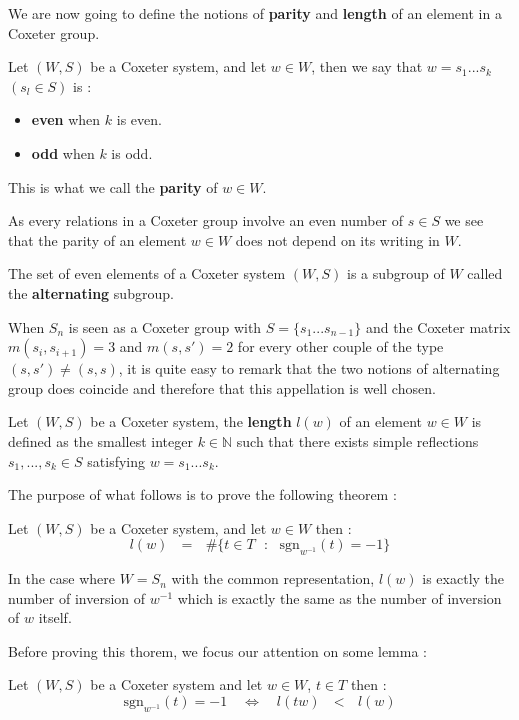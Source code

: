 \documentclass[envcountsame,envcountchap]{svmono}
\newcommand{\N}{\mathbb N}
\newcommand{\tg}[1]{\textbf{#1}}
\newcommand{\q}{\quad}
\newcommand{\qq}{\text{ }}
\begin{document}
	We are now going to define the notions of \tg{parity} and \tg{length} of an element in a Coxeter group.
	\begin{definition}
		Let $(W,S)$ be a Coxeter system, and let $w\in W$, then we say that $w=s_1...s_k$ $(s_l\in S)$ is :
		\begin{itemize}
			\item \tg{even} when $k$ is even.
			\item \tg{odd} when $k$ is odd.
		\end{itemize}
	This is what we call the \tg{parity} of $w\in W$.
	\end{definition}
\begin{remark}
	As every relations in a Coxeter group involve an even number of $s\in S$ we see that the parity of an element $w\in W$ does not depend on its writing in $W$.
\end{remark}
The set of even elements of a Coxeter system $(W,S)$ is a subgroup of $W$ called the \tg{alternating} subgroup.
\begin{remark}
	When $S_n$ is seen as a Coxeter group with $S=\{s_1...s_{n-1}\}$ and the Coxeter matrix $m(s_i,s_{i+1})=3$ and $m(s,s')=2$ for every other couple of the type $(s,s')\not=(s,s)$, it is quite easy to remark that the two notions of alternating group does coincide and therefore that this appellation is well chosen.
\end{remark}
\begin{definition}
	Let $(W,S)$ be a Coxeter system, the \tg{length} $l(w)$ of an element $w\in W$ is defined as the smallest integer $k\in \N$ such that there exists simple reflections $s_1,...,s_k\in S$ satisfying $w=s_1...s_k$.
\end{definition}
The purpose of what follows is to prove the following theorem :
\begin{theorem}\label{theorem sur le calcul des longueurs}
	Let $(W,S)$ be a Coxeter system, and let $w\in W$ then :
	\begin{equation}
	l(w)\qq=\qq \#\{t\in T\qq :\qq \mbox{sgn}_{w^{-1}}(t)=-1\}
	\end{equation}
\end{theorem}
\begin{example}
	In the case where $W=S_n$ with the common representation, $l(w)$ is exactly the number of inversion of $w^{-1}$ which is exactly the same as the number of inversion of $w$ itself.
\end{example}
Before proving this thorem, we focus our attention on some lemma :
\begin{lemma}\label{le lemme de la longueur de tw}
	Let $(W,S)$ be a Coxeter system and let $w\in W$, $t\in T$ then :
	\begin{equation}
	\mbox{sgn}_{w^{-1}}(t)=-1\q \iff \q l(tw)\qq<\qq l(w)
	\end{equation}
\end{lemma}
\end{document}
